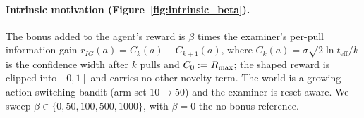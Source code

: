 \paragraph{Intrinsic motivation (Figure~\ref{fig:intrinsic_beta}).} The bonus added to the agent's reward is $\beta$ times the examiner's per-pull information gain $r_{IG}(a) = C_k(a) - C_{k+1}(a)$, where $C_k(a) = \sigma\sqrt{2\ln t_{\mathrm{eff}}/k}$ is the confidence width after $k$ pulls and $C_0 := R_{\max}$; the shaped reward is clipped into $[0,1]$ and carries no other novelty term. The world is a growing-action switching bandit (arm set $10 \to 50$) and the examiner is reset-aware. We sweep $\beta \in \{0, 50, 100, 500, 1000\}$, with $\beta = 0$ the no-bonus reference.
